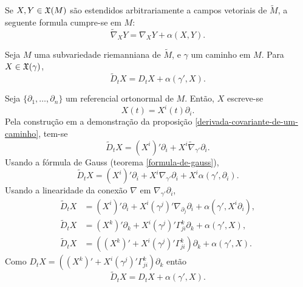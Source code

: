 \begin{teorema}\label{formula-de-gauss}
	Se $X,Y \in \mathfrak{X}(M)$ são estendidos arbitrariamente a campos vetoriais de $\tilde{M}$, a seguente formula cumpre-se em $M$:
	\begin{equation*}
		\tilde{\nabla}_X Y = \nabla_X Y + \alpha(X,Y).
	\end{equation*}
\end{teorema}

\begin{proposicao}\label{formula-de-gauss-para-caminhos}
	Seja $M$ uma subvariedade riemanniana de $\tilde{M}$, e $\gamma$ um caminho em $M$. Para $X \in \mathfrak{X}(\gamma)$,
	\begin{equation*}
	\tilde{D}_t X = D_t X + \alpha(\gamma', X).
	\end{equation*}
\end{proposicao}

\begin{demonstracao}
	Seja $\{\partial_1, \ldots, \partial_n \}$ um referencial ortonormal de $M$. Então, $X$ escreve-se
	\begin{equation*}
	X(t) = X^i(t) \partial_i.
	\end{equation*}
	Pela construção em a demonstração da proposição \ref{derivada-covariante-de-um-caminho}, tem-se
	\begin{equation*}
	\tilde{D}_t X = (X^i)' \partial_i + X^i \tilde{\nabla}_{\gamma'} \partial_i.
	\end{equation*}
	Usando a fórmula de Gauss (teorema \ref{formula-de-gauss}),
	\begin{equation*}
	\tilde{D}_t X = (X^i)' \partial_i + X^i \nabla_{\gamma'} \partial_i + X^i \alpha(\gamma', \partial_i).
	\end{equation*}
	Usando a linearidade da conexão $\nabla$ em $\nabla_{\gamma'} \partial_i$,
	\begin{align*}
	\tilde{D}_t X &= (X^i)' \partial_i + X^i (\gamma^j)' \nabla_{\partial_j} \partial_i + \alpha(\gamma', X^i \partial_i),\\
	\tilde{D}_t X &= (X^k)' \partial_k + X^i (\gamma^j)' \Gamma_{ji}^k \partial_k + \alpha(\gamma', X),\\
	\tilde{D}_t X &=  \left((X^k)' + X^i (\gamma^j)' \Gamma_{ji}^k\right) \partial_k + \alpha(\gamma', X).
	\end{align*}
	Como $D_t X = \left((X^k)' + X^i (\gamma^j)' \Gamma_{ji}^k\right) \partial_k$ então
	\begin{equation*}
	\tilde{D}_t X = D_t X + \alpha(\gamma',X).
	\end{equation*}
\end{demonstracao}

